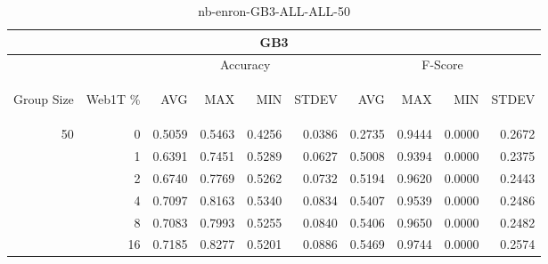 \begin{center}
\begin{table}[htbp]
\begin{tabular}{ | r | r | r | r | r | r | r | r | r | r |}
\hline
\multicolumn{10}{|c|}{GB3}\\
\hline
 & & \multicolumn{4}{|c|}{Accuracy} & \multicolumn{4}{|c|}{F-Score}\\ \cline{3-10}
\begin{sideways}Group Size\end{sideways} & \begin{sideways}Web1T \%\end{sideways} & \begin{sideways}AVG\end{sideways} & \begin{sideways}MAX\end{sideways} & \begin{sideways}MIN\end{sideways} & \begin{sideways}STDEV\end{sideways} & \begin{sideways}AVG\end{sideways} & \begin{sideways}MAX\end{sideways} & \begin{sideways}MIN\end{sideways} & \begin{sideways}STDEV\end{sideways}\\
\hline
\multirow{5}{*}{50}
 & 0 & 0.5059 & 0.5463 & 0.4256 & 0.0386 & 0.2735 & 0.9444 & 0.0000 & 0.2672\\ \cline{2-10}
 & 1 & 0.6391 & 0.7451 & 0.5289 & 0.0627 & 0.5008 & 0.9394 & 0.0000 & 0.2375\\ \cline{2-10}
 & 2 & 0.6740 & 0.7769 & 0.5262 & 0.0732 & 0.5194 & 0.9620 & 0.0000 & 0.2443\\ \cline{2-10}
 & 4 & 0.7097 & 0.8163 & 0.5340 & 0.0834 & 0.5407 & 0.9539 & 0.0000 & 0.2486\\ \cline{2-10}
 & 8 & 0.7083 & 0.7993 & 0.5255 & 0.0840 & 0.5406 & 0.9650 & 0.0000 & 0.2482\\ \cline{2-10}
 & 16 & 0.7185 & 0.8277 & 0.5201 & 0.0886 & 0.5469 & 0.9744 & 0.0000 & 0.2574\\ \cline{2-10}
\hline
\end{tabular}
\caption{nb-enron-GB3-ALL-ALL-50}
\label{table:nb-enron-GB3-ALL-ALL-50}
\end{table}
\end{center}

